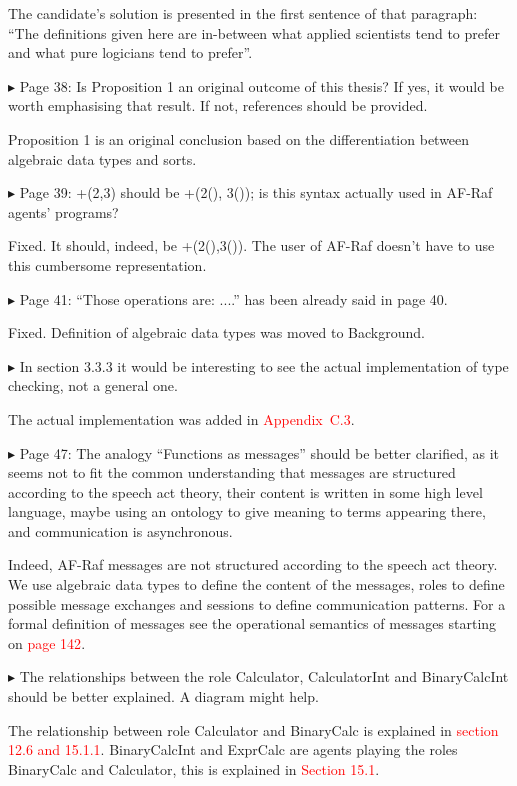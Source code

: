 \documentclass{article}
\newcommand*\R[1]{\textcolor{red}{#1}} %
\newenvironment{them}%
  {\bigskip\noindent\begingroup\color{blue}$\blacktriangleright$\enspace}%
  {\endgroup\par}
\begin{document}
The candidate's solution is presented in the first sentence of that paragraph:
``The definitions given here are in-between what applied scientists tend to
prefer and what pure logicians tend to prefer''.

\begin{them}
Page 38:
Is Proposition 1 an original outcome of this thesis? If yes, it would be worth
emphasising that result. If not, references should be provided.
\end{them}
Proposition 1 is an original conclusion based on the differentiation between
algebraic data types and sorts. 

\begin{them}
Page 39:
+(2,3) should be +(2(), 3()); is this syntax actually used in AF-Raf agents'
programs?
\end{them}

Fixed. It should, indeed, be +(2(),3()). The user of AF-Raf doesn't have to use
this cumbersome representation.

\begin{them}
Page 41:
``Those operations are: ....'' has been already said in page 40.
\end{them}

Fixed. Definition of algebraic data types was moved to Background.

\begin{them}
In section 3.3.3 it would be interesting to see the actual implementation of
type checking, not a general one.
\end{them}

The actual implementation was added in \R{Appendix~C.3}.

\begin{them}
Page 47:
The analogy ``Functions as messages'' should be better clarified, as it seems not
to fit the common understanding that messages are structured according to the
speech act theory, their content is written in some high level language, maybe
using an ontology to give meaning to terms appearing there, and communication
is asynchronous.
\end{them}
Indeed, AF-Raf messages are not structured according to  the speech act
theory.  We use algebraic data types to define the content of the messages,
roles to define possible message exchanges and sessions to define communication
patterns. For a formal definition of messages see the operational semantics of
messages starting on \R{page 142}.

\begin{them}
The relationships between the role Calculator, CalculatorInt and BinaryCalcInt
should be better explained. A diagram might help.
\end{them}
The relationship between role Calculator and BinaryCalc is explained in
\R{section 12.6 and 15.1.1}. BinaryCalcInt and ExprCalc are agents playing the
roles BinaryCalc and Calculator, this is explained in \R{Section 15.1}.
\end{document}
